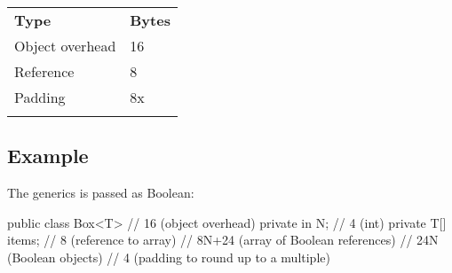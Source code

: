 \begin{tabular}{ll}
\hline\noalign{\smallskip}
\textbf{Type} & \textbf{Bytes} \\
\noalign{\smallskip}\hline\noalign{\smallskip}

Object overhead & 16 \\
Reference & 8 \\
Padding & 8x \\

\noalign{\smallskip}\hline\noalign{\smallskip}
\caption{for objects}
\end{tabular}

\subsection{Example}
The generics is passed as Boolean:
\begin{java}
public class Box<T> {   // 16 (object overhead)
    private in N;       // 4 (int)
    private T[] items;  // 8 (reference to array)
                        // 8N+24 (array of Boolean references)
                        // 24N (Boolean objects)
                        // 4 (padding to round up to a multiple)
}
\end{java} 
